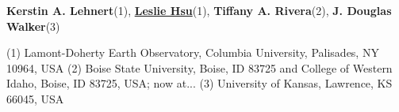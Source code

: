 \textbf{Kerstin A. Lehnert}(1), \href{https://www.authorea.com/users/7580}{\textbf{Leslie Hsu}}(1), \textbf{Tiffany A. Rivera}(2), \textbf{J. Douglas Walker}(3)

(1) Lamont-Doherty Earth Observatory, Columbia University, Palisades, NY 10964, USA
(2) Boise State University, Boise, ID 83725 and College of Western Idaho, Boise, ID 83725, USA; now at...
(3) University of Kansas, Lawrence, KS 66045, USA
